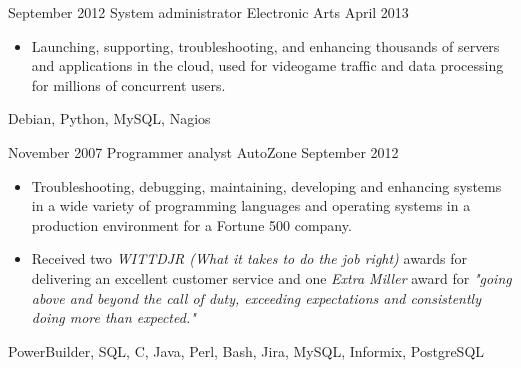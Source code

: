 \begin{experiences}
    \experience
        {September 2012}
        {System administrator}
        {Electronic Arts}
        {April 2013}
        {
            \begin{itemize}
                \item Launching, supporting, troubleshooting, and enhancing
                    thousands of servers and applications in the cloud, used 
                    for videogame traffic and data processing for millions of 
                    concurrent users.
            \end{itemize}
        }
        {
            Debian,
            Python,
            MySQL,
            Nagios
        }

    \emptySeparator

    \experience
        {November 2007}
        {Programmer analyst}
        {AutoZone}
        {September 2012}
        {
            \begin{itemize}
                \item Troubleshooting, debugging, maintaining, developing and 
                    enhancing systems in a wide variety of programming 
                    languages and operating systems in a production environment 
                    for a Fortune 500 company.
                \item Received two \textit{WITTDJR (What it takes to do the job 
                    right)} awards for delivering an excellent customer service 
                    and one \textit{Extra Miller} award for \textit{"going 
                    above and beyond the call of duty, exceeding expectations 
                    and consistently doing more than expected."}
            \end{itemize}
        }
        {
            PowerBuilder, 
            SQL, 
            C, 
            Java, 
            Perl, 
            Bash, 
            Jira, 
            MySQL, 
            Informix, 
            PostgreSQL
        }

\end{experiences}
